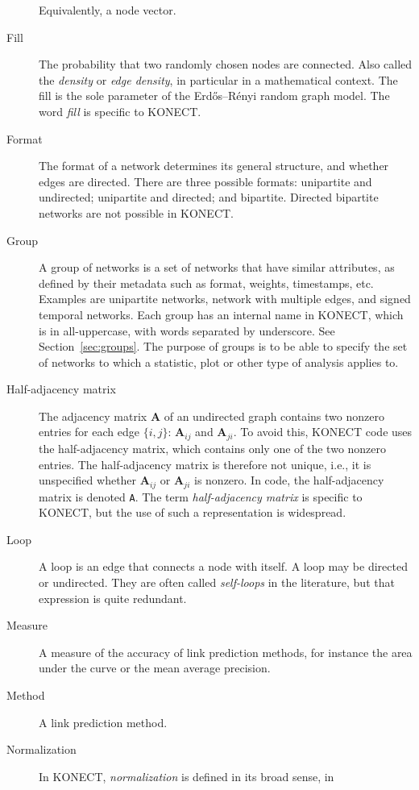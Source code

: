 \documentclass{article}
\begin{document}
\begin{description}
    Equivalently, a node vector.
  \item[Fill] The probability that two randomly chosen nodes are
    connected.  Also called the \emph{density} or \emph{edge density}, in particular in a
    mathematical context.  The fill is the sole parameter of the
    Erdős--Rényi random graph model.  The word \emph{fill} is specific
    to KONECT. 
  \item[Format] 
    The format of a network determines its general structure, and
    whether edges are directed.  There are three possible formats:
    unipartite and undirected; unipartite and directed; and bipartite.
    Directed bipartite networks are not possible in KONECT.  
  \item[Group]
    A group of networks is a set of networks that have similar
    attributes, as defined by their metadata such as format, weights,
    timestamps, etc.  Examples are unipartite networks, network with
    multiple edges, and signed temporal networks.  Each group has an
    internal name in KONECT, which is in all-uppercase, with words
    separated by underscore.  See Section~\ref{sec:groups}.  The purpose
    of groups is to be able to specify the set of networks to which a
    statistic, plot or other type of analysis applies to.
  \item[Half-adjacency matrix]
    The adjacency matrix $\mathbf A$ of an undirected graph contains two
    nonzero entries for each edge $\{i,j\}$:  $\mathbf A_{ij}$ and
    $\mathbf A_{ji}$.  To avoid this, KONECT code uses the
    half-adjacency matrix, which contains only one of the two nonzero
    entries.  The half-adjacency matrix is therefore not unique, i.e.,
    it is unspecified whether $\mathbf A_{ij}$ or $\mathbf A_{ji}$ is nonzero.  In
    code, the half-adjacency matrix is denoted \texttt{A}.  The term
    \emph{half-adjacency matrix} is specific to KONECT, but the use of
    such a representation is widespread. 
  \item[Loop] 
    A loop is an edge that connects a node with itself.  A loop may be
    directed or undirected.  They are often called \emph{self-loops} in
    the literature, but that expression is quite redundant. 
  \item[Measure]
    A measure of the accuracy of link prediction methods, for instance
    the area under the curve or the mean average precision.  
  \item[Method]
    A link prediction method. 
  \item[Normalization]
    In KONECT, \emph{normalization} is defined in its broad sense, in

\end{description}
\end{document}
